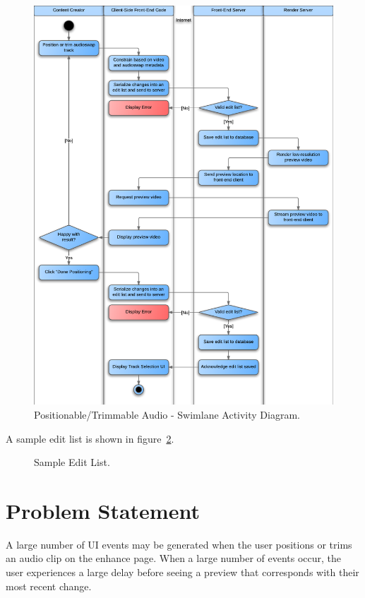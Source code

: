 \documentclass[se,resubmit]{uw-wkrpt}
\begin{document}
\begin{figure}
  \centering
  \includegraphics{swimlane}
  \caption{Positionable/Trimmable Audio - Swimlane Activity Diagram.}
  \label{fig:swimlane}
\end{figure}

A sample edit list is shown in figure~\ref{fig:editlist}.

\begin{figure}
  \centering
  
  \caption{Sample Edit List.}
  \label{fig:editlist}
\end{figure}

\section{Problem Statement}\label{sec:problem}
A large number of UI events may be generated when the user positions or
trims an audio clip on the enhance page. When a large number of events
occur, the user experiences a large delay before seeing a preview that
corresponds with their most recent change.
\end{document}
